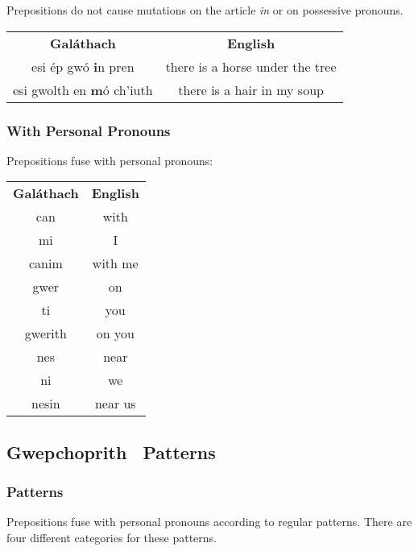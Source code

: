 Prepositions do not cause mutations on the article \textit{in} or on possessive pronouns.
\begin{table}[H]
\centering
\begin{tabular}{cc}
  \toprule
  \textbf{Gal\'{a}thach} & \textbf{English}\\
  \cmidrule(lr){1-1}\cmidrule(lr){2-2}
  esi \'{e}p gw\'{o} \textbf{i}n pren & there is a horse under the tree\\
  esi gwolth en \textbf{m}\'{o} ch'iuth & there is a hair in my soup\\
  \bottomrule
\end{tabular}
\label{examples_prepositions_no_mutation_on_in}
\end{table}

\subsubsection{With Personal Pronouns}

Prepositions fuse with personal pronouns:
\begin{table}[H]
\centering
\begin{tabular}{cc}
  \toprule
  \textbf{Gal\'{a}thach} & \textbf{English}\\
  \cmidrule(lr){1-1}\cmidrule(lr){2-2}
  can & with\\
  mi & I\\
  canim & with me\\
  \cmidrule(lr){1-1}\cmidrule(lr){2-2}
  gwer & on\\
  ti & you\\
  gwerith & on you\\
  \cmidrule(lr){1-1}\cmidrule(lr){2-2}
  nes & near\\
  ni & we\\
  nesin & near us\\
  \bottomrule
\end{tabular}
\label{examples_prepositions_fusing}
\end{table}

\subsection{Gwepchoprith \textendash\ Patterns}
\subsubsection{Patterns}

Prepositions fuse with personal pronouns according to regular patterns. There are four different categories for these patterns.

